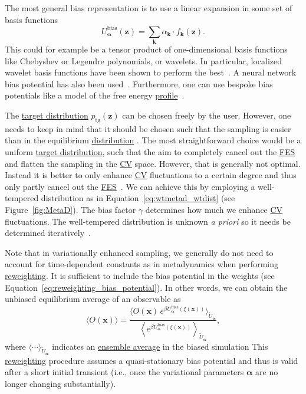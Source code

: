 \documentclass[9pt,review]{livecoms}
\newcommand{\vx}{\mathbf{x}}
\newcommand{\vz}{\mathbf{z}}
\begin{document}
The most general bias representation is to use a linear expansion in some set of basis functions
\begin{equation}
U_{\boldsymbol{\alpha}}^{\mathrm{bias}}(\vz) = \sum_{\mathbf{k}} \alpha_{\mathbf{k}} \cdot f_{\mathbf{k}}(\vz).
\end{equation}
This could for example be a tensor product of one-dimensional basis functions like Chebyshev or Legendre polynomials, or wavelets. In particular, localized wavelet basis functions have been shown to perform the best~\cite{ValssonPampel_Wavelets_2022}. A neural network bias potential has also been used~\cite{Bonati2019_NN-VES}. Furthermore, one can use bespoke bias potentials like a model of the free energy \hyperlink{ref:FES} {profile}~\cite{McCarty2016_JCTC,Piaggi2016_Faraday}.

The \hyperlink{ref:targetdist}{target distribution} $p_{\mathrm{tg}}(\vz)$ can be chosen freely by the user. However, one needs to keep in mind that it should be chosen such that the sampling is easier than in the equilibrium \hyperlink{ref:Distribution} {distribution} . The most straightforward choice would be a uniform \hyperlink{ref:targetdist}{target distribution}, such that the aim to completely cancel out the \hyperlink{ref:FES} {FES} and flatten the sampling in the \hyperlink{ref:CV} {CV} space. However, that is generally not optimal. Instead it is better to only enhance \hyperlink{ref:CV} {CV} fluctuations to a certain degree and thus only partly cancel out the \hyperlink{ref:FES} {FES}~\cite{Valsson-JCTC-2015}. We can achieve this by employing a well-tempered distribution as in Equation~\ref{eq:wtmetad_wtdist} (see Figure~\ref{fig:MetaD}). The bias factor $\gamma$ determines how much we enhance \hyperlink{ref:CV} {CV} fluctuations. The well-tempered distribution is unknown \textit{a priori} so it needs be determined iteratively~\cite{Valsson-JCTC-2015}.

Note that in variationally enhanced sampling, we generally do not need to account for time-dependent constants as in metadynamics when performing \hyperlink{ref:Reweighting} {reweighting}. It is sufficient to include the bias potential in the weights (see Equation~\ref{eq:reweighting_bias_potential}). In other words, we can obtain the unbiased equilibrium average of an observable as
\begin{equation}
\label{ves_reweighting}
\langle O(\vx) \rangle = \frac{\langle O(\vx)
\,
e^{
\beta
U_{\boldsymbol{\alpha}}^{\mathrm{bias}}(\xi(\vx))
}\rangle_{\tilde U_{\boldsymbol{\alpha}}}}
{\left\langle
e^{\beta
U_{\boldsymbol{\alpha}}^{\mathrm{bias}}(\xi(\vx))
} \right\rangle_{\tilde U_{\boldsymbol{\alpha}}}},
\end{equation}
where $\langle \cdots \rangle_{\tilde U_{\boldsymbol{\alpha}}}$ indicates an \hyperlink{ref:ensemble_average} {ensemble average} in the biased simulation  This \hyperlink{ref:Reweighting} {reweighting} procedure assumes a quasi-stationary bias potential and thus is valid after a short initial transient (i.e., once the variational parameters $\boldsymbol{\alpha}$ are no longer changing substantially).
\end{document}

